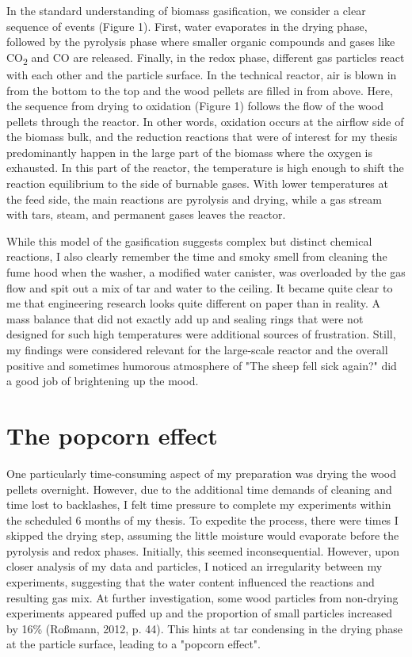 \documentclass[authordate, anecdote]{jote-new-article}
\begin{document}
	In the standard understanding of biomass gasification, we consider a clear sequence of events (Figure 1). First, water evaporates in the drying phase, followed by the pyrolysis phase where smaller organic compounds and gases like CO\textsubscript{2} and CO are released. Finally, in the redox phase, different gas particles react with each other and the particle surface. In the technical reactor, air is blown in from the bottom to the top and the wood pellets are filled in from above. Here, the sequence from drying to oxidation (Figure 1) follows the flow of the wood pellets through the reactor. In other words, oxidation occurs at the airflow side of the biomass bulk, and the reduction reactions that were of interest for my thesis predominantly happen in the large part of the biomass where the oxygen is exhausted. In this part of the reactor, the temperature is high enough to shift the reaction equilibrium to the side of burnable gases. With lower temperatures at the feed side, the main reactions are pyrolysis and drying, while a gas stream with tars, steam, and permanent gases leaves the reactor.



	While this model of the gasification suggests complex but distinct chemical reactions, I also clearly remember the time and smoky smell from cleaning the fume hood when the washer, a modified water canister, was overloaded by the gas flow and spit out a mix of tar and water to the ceiling. It became quite clear to me that engineering research looks quite different on paper than in reality. A mass balance that did not exactly add up and sealing rings that were not designed for such high temperatures were additional sources of frustration. Still, my findings were considered relevant for the large-scale reactor and the overall positive and sometimes humorous atmosphere of "The sheep fell sick again?" did a good job of brightening up the mood.



	\section{The popcorn effect}



	One particularly time-consuming aspect of my preparation was drying the wood pellets overnight. However, due to the additional time demands of cleaning and time lost to backlashes, I felt time pressure to complete my experiments within the scheduled 6 months of my thesis. To expedite the process, there were times I skipped the drying step, assuming the little moisture would evaporate before the pyrolysis and redox phases. Initially, this seemed inconsequential. However, upon closer analysis of my data and particles, I noticed an irregularity between my experiments, suggesting that the water content influenced the reactions and resulting gas mix. At further investigation, some wood particles from non-drying experiments appeared puffed up and the proportion of small particles increased by 16\% (Roßmann, 2012, p. 44). This hints at tar condensing in the drying phase at the particle surface, leading to a "popcorn effect".
\end{document}
